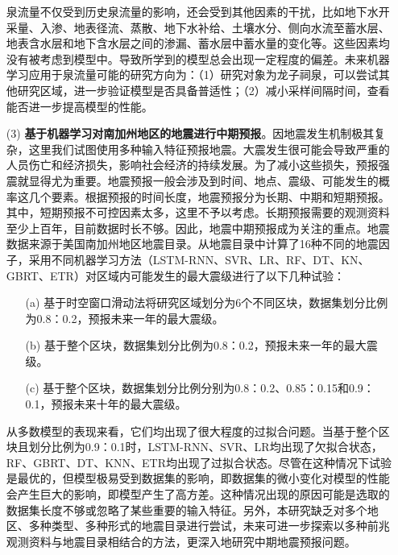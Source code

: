 \begin{enumerate}
  泉流量不仅受到历史泉流量的影响，还会受到其他因素的干扰，比如地下水开采量、入渗、地表径流、蒸散、地下水补给、土壤水分、侧向水流至蓄水层、地表含水层和地下含水层之间的渗漏、蓄水层中蓄水量的变化等。这些因素均没有被考虑到模型中。导致所学到的模型总会出现一定程度的偏差。未来机器学习应用于泉流量可能的研究方向为：（1）研究对象为龙子祠泉，可以尝试其他研究区域，进一步验证模型是否具备普适性；（2）减小采样间隔时间，查看能否进一步提高模型的性能。

  \item[(3)] \textbf{基于机器学习对南加州地区的地震进行中期预报}。因地震发生机制极其复杂，这里我们试图使用多种输入特征预报地震。大震发生很可能会导致严重的人员伤亡和经济损失，影响社会经济的持续发展。为了减小这些损失，预报强震就显得尤为重要。地震预报一般会涉及到时间、地点、震级、可能发生的概率这几个要素。根据预报的时间长度，地震预报分为长期、中期和短期预报。其中，短期预报不可控因素太多，这里不予以考虑。长期预报需要的观测资料至少上百年，目前数据时长不够。因此，地震中期预报成为关注的重点。地震数据来源于美国南加州地区地震目录。从地震目录中计算了16种不同的地震因子，采用不同机器学习方法（LSTM-RNN、SVR、LR、RF、DT、KN、GBRT、ETR）对区域内可能发生的最大震级进行了以下几种试验：
  \begin{itemize}
    \item[(a)] 基于时空窗口滑动法将研究区域划分为6个不同区块，数据集划分比例为0.8：0.2，预报未来一年的最大震级。
    \item[(b)] 基于整个区块，数据集划分比例为0.8：0.2，预报未来一年的最大震级。
    \item[(c)] 基于整个区块，数据集划分比例分别为0.8：0.2、0.85：0.15和0.9：0.1，预报未来十年的最大震级。
  \end{itemize}
    
  从多数模型的表现来看，它们均出现了很大程度的过拟合问题。当基于整个区块且划分比例为0.9：0.1时，LSTM-RNN、SVR、LR均出现了欠拟合状态，RF、GBRT、DT、KNN、ETR均出现了过拟合状态。尽管在这种情况下试验是最优的，但模型极易受到数据集的影响，即数据集的微小变化对模型的性能会产生巨大的影响，即模型产生了高方差。这种情况出现的原因可能是选取的数据集长度不够或忽略了某些重要的输入特征。另外，本研究缺乏对多个地区、多种类型、多种形式的地震目录进行尝试，未来可进一步探索以多种前兆观测资料与地震目录相结合的方法，更深入地研究中期地震预报问题。

\end{enumerate}
